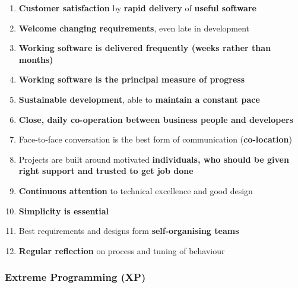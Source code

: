 \documentclass[a4paper]{article}
\providecommand{\tightlist}{%
  \setlength{\itemsep}{0pt}\setlength{\parskip}{0pt}}
\begin{document}
\begin{enumerate}
\def\labelenumi{\arabic{enumi}.}
\tightlist
\item
  \textbf{Customer satisfaction} by \textbf{rapid delivery} of
  \textbf{useful software}
\item
  \textbf{Welcome changing requirements}, even late in development
\item
  \textbf{Working software is delivered frequently (weeks rather than
  months)}
\item
  \textbf{Working software is the principal measure of progress}
\item
  \textbf{Sustainable development}, able to \textbf{maintain a constant
  pace}
\item
  \textbf{Close, daily co-operation between business people and
  developers}
\item
  Face-to-face conversation is the best form of communication
  (\textbf{co-location})
\item
  Projects are built around motivated \textbf{individuals, who should be
  given right support and trusted to get job done}
\item
  \textbf{Continuous attention} to technical excellence and good design
\item
  \textbf{Simplicity is essential}
\item
  Best requirements and designs form \textbf{self-organising teams}
\item
  \textbf{Regular reflection} on process and tuning of behaviour
\end{enumerate}

\hypertarget{extreme-programming-xp}{%
\subsubsection{Extreme Programming (XP)}\label{extreme-programming-xp}}
\end{document}
